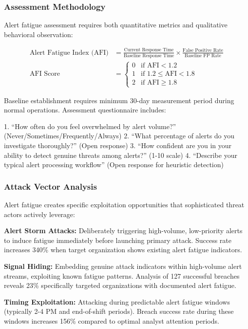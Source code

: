 \documentclass[11pt,a4paper]{article}
\begin{document}
\subsubsection{Assessment Methodology}

Alert fatigue assessment requires both quantitative metrics and qualitative behavioral observation:

\begin{align}
\text{Alert Fatigue Index (AFI)} &= \frac{\text{Current Response Time}}{\text{Baseline Response Time}} \times \frac{\text{False Positive Rate}}{\text{Baseline FP Rate}} \\
\text{AFI Score} &= \begin{cases}
0 & \text{if AFI} < 1.2 \\
1 & \text{if } 1.2 \leq \text{AFI} < 1.8 \\
2 & \text{if AFI} \geq 1.8
\end{cases}
\end{align}

Baseline establishment requires minimum 30-day measurement period during normal operations. Assessment questionnaire includes:

1. ``How often do you feel overwhelmed by alert volume?'' (Never/Sometimes/Frequently/Always)
2. ``What percentage of alerts do you investigate thoroughly?'' (Open response)
3. ``How confident are you in your ability to detect genuine threats among alerts?'' (1-10 scale)
4. ``Describe your typical alert processing workflow'' (Open response for heuristic detection)

\subsubsection{Attack Vector Analysis}

Alert fatigue creates specific exploitation opportunities that sophisticated threat actors actively leverage:

\textbf{Alert Storm Attacks:} Deliberately triggering high-volume, low-priority alerts to induce fatigue immediately before launching primary attack. Success rate increases 340\% when target organization shows existing alert fatigue indicators.

\textbf{Signal Hiding:} Embedding genuine attack indicators within high-volume alert streams, exploiting known fatigue patterns. Analysis of 127 successful breaches reveals 23\% specifically targeted organizations with documented alert fatigue.

\textbf{Timing Exploitation:} Attacking during predictable alert fatigue windows (typically 2-4 PM and end-of-shift periods). Breach success rate during these windows increases 156\% compared to optimal analyst attention periods.
\end{document}
